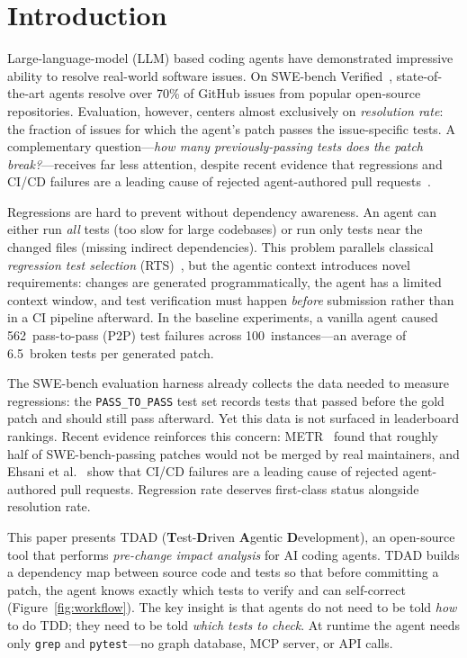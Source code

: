 \documentclass[sigconf,nonacm]{acmart}
\begin{document}
\section{Introduction}
\label{sec:intro}

Large-language-model (LLM) based coding agents have demonstrated impressive
ability to resolve real-world software issues.  On SWE-bench
Verified~\cite{jimenez2024swebench}, state-of-the-art agents resolve over 70\%
of GitHub issues from popular open-source repositories.  Evaluation, however,
centers almost exclusively on \emph{resolution rate}: the fraction of issues
for which the agent's patch passes the issue-specific tests.  A complementary
question---\emph{how many previously-passing tests does the patch
break?}---receives far less attention, despite recent evidence that
regressions and CI/CD failures are a leading cause of rejected agent-authored
pull requests~\cite{metr2026swebench,ehsani2026agentfail}.

Regressions are hard to prevent without dependency awareness.  An agent can
either run \emph{all} tests (too slow for large codebases) or run only tests
near the changed files (missing indirect dependencies).  This problem
parallels classical \emph{regression test selection}
(RTS)~\cite{elbaum2014techniques,legunsen2016extensive}, but the agentic
context introduces novel requirements: changes are generated
programmatically, the agent has a limited context window, and test
verification must happen \emph{before} submission rather than in a CI
pipeline afterward.  In the baseline experiments, a vanilla agent caused
562~pass-to-pass (P2P) test failures across 100~instances---an average
of 6.5~broken tests per generated patch.

The SWE-bench evaluation harness already collects the data needed to measure
regressions: the \texttt{PASS\_TO\_PASS} test set records tests that passed
before the gold patch and should still pass afterward.  Yet this data is not
surfaced in leaderboard rankings.  Recent evidence reinforces this concern:
METR~\cite{metr2026swebench} found that roughly half of SWE-bench-passing
patches would not be merged by real maintainers, and Ehsani et
al.~\cite{ehsani2026agentfail} show that CI/CD failures are a leading cause
of rejected agent-authored pull requests.  Regression rate deserves
first-class status alongside resolution rate.

This paper presents \textsc{TDAD} (\textbf{T}est-\textbf{D}riven
\textbf{A}gentic \textbf{D}evelopment), an open-source tool that performs
\emph{pre-change impact analysis} for AI coding agents.  \textsc{TDAD}
builds a dependency map between source code and tests so that before
committing a patch, the agent knows exactly which tests to verify and can
self-correct (Figure~\ref{fig:workflow}).  The key insight is that agents
do not need to be told \emph{how} to do TDD; they need to be told
\emph{which tests to check}.  At runtime the agent needs only \texttt{grep}
and \texttt{pytest}---no graph database, MCP server, or API calls.
\end{document}
